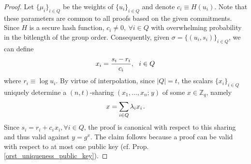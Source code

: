 \documentclass[psamsfonts, reqno]{amsart}
\theoremstyle{definition}
\theoremstyle{remark}
\numberwithin{equation}{section}
\begin{document}
\begin{proof}
Let $\{\mu_i\}_{i \in Q}$
be the weights of $\{u_i\}_{i \in Q}$
and denote $c_i \equiv H(u_i)$.
Note that these parameters
are common to all proofs based on the
given commitments.
Since $H$ is a secure hash function,
$c_i \neq 0,\ \forall i \in Q$
with overwhelming probability in
the bitlength of the group order.
Consequently, given $\sigma = \{(u_i, s_i)\}_{i \in Q}$,
we can define
\vspace{5pt}
\begin{equation*}
x_i = \frac{s_i - r_i}{c_i},
\ \ i \in Q\hspace{1pt}
\vspace{5pt}
\end{equation*}
where $r_i \equiv \log u_i$.
By virtue of interpolation,
since $|Q| = t$, the scalars $\{x_i\}_{i \in Q}$
uniquely determine a $(n, t)$-sharing
$(x_1, \dots, x_n;\hspace{1pt} y)$
of some $x \in \mathbb{Z}_q$, namely
\vspace{5pt}
\begin{equation*}
x = \sum_{i \in Q} \lambda_i x_i\hspace{1pt}.
\vspace{5pt}
\end{equation*}
Since $s_i = r_i + c_i\hspace{1pt}x_i,\forall i \in Q$,
the proof is canonical with respect to this sharing
and thus valid against $y = g ^ x$.
The claim follows because a proof can be valid
with respect to at most one public key
(cf. Prop. \ref{orst_uniqueness_public_key}).
\end{proof}
\end{document}
